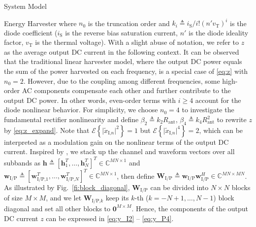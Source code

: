 \documentclass[journal]{IEEEtran}
\begin{document}
\begin{section}{System Model}
\begin{subsection}{Energy Harvester}
			where $n_0$ is the truncation order and $k_i \triangleq i_{\text{S}}/i!(n'v_{\text{T}})^i$ is the diode coefficient ($i_{\text{S}}$ is the reverse bias saturation current, $n'$ is the diode ideality factor, $v_{\text{T}}$ is the thermal voltage). With a slight abuse of notation, we refer to $z$ as the average output DC current in the following context. It can be observed that the traditional linear harvester model, where the output DC power equals the sum of the power harvested on each frequency, is a special case of \eqref{eq:z} with $n_0=2$. However, due to the coupling among different frequencies, some high-order AC components compensate each other and further contribute to the output DC power. In other words, even-order terms with $i \ge 4$ account for the diode nonlinear behavior. For simplicity, we choose $n_0=4$ to investigate the fundamental rectifier nonlinearity and define $\beta_2 \triangleq {k_2}{R_{\text{ant}}}$, $\beta_4 \triangleq {k_4}{R_{\text{ant}}^2}$ to rewrite $z$ by \eqref{eq:z_expand}. Note that $\mathcal{E}\left\{\lvert\tilde{x}_{\text{I,}n}\rvert^2\right\}=1$ but $\mathcal{E}\left\{\lvert\tilde{x}_{\text{I,}n}\rvert^4\right\}=2$, which can be interpreted as a modulation gain on the nonlinear terms of the output DC current. Inspired by \cite{Huang2017}, we stack up the channel and waveform vectors over all subbands as $\boldsymbol{h} \triangleq [\boldsymbol{h}_1^T,\dots,\boldsymbol{h}_N^T]^T \in \mathbb{C}^{MN \times 1}$ and $\boldsymbol{w}_{\text{I/P}} \triangleq [\boldsymbol{w}_{\text{I/P,}1}^T,\dots,\boldsymbol{w}_{\text{I/P,}N}^T]^T \in \mathbb{C}^{MN \times 1}$, then define $\boldsymbol{W}_{\text{I/P}} \triangleq \boldsymbol{w}_{\text{I/P}}\boldsymbol{w}_{\text{I/P}}^H \in \mathbb{C}^{MN \times MN}$. As illustrated by Fig.~\ref{fi:block_diagonal}, $\boldsymbol{W}_{\text{I/P}}$ can be divided into $N \times N$ blocks of size $M \times M$, and we let $\boldsymbol{W}_{\text{I/P,}k}$ keep its $k$-th ($k=-N+1,\dots,N-1$) block diagonal and set all other blocks to $\boldsymbol{0}^{M \times M}$. Hence, the components of the output DC current $z$ can be expressed in \eqref{eq:y_I2} -- \eqref{eq:y_P4}.


\end{subsection}
\end{section}
\end{document}
